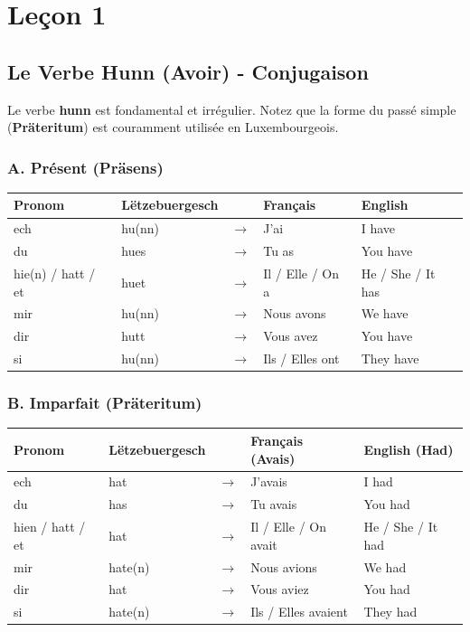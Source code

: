 \chapter{Leçon 1}

	\section{Le Verbe \textbf{Hunn} (Avoir) - Conjugaison}
	Le verbe \textbf{hunn} est fondamental et irrégulier. Notez que la forme du passé simple (\textbf{Präteritum}) est couramment utilisée en Luxembourgeois.
	
	\subsection*{A. Présent (Präsens)}
	\begin{tabular}{ll c l l}
		\toprule
		\textbf{Pronom} & \textbf{Lëtzebuergesch} & \textbf{} & \textbf{Français} & \textbf{English} \\
		\midrule
		ech & hu(nn) & $\rightarrow$ & J'ai & I have \\
		du & hues & $\rightarrow$ & Tu as & You have \\
		hie(n) / hatt / et & huet & $\rightarrow$ & Il / Elle / On a & He / She / It has \\
		\midrule
		mir & hu(nn) & $\rightarrow$ & Nous avons & We have \\
		dir & hutt & $\rightarrow$ & Vous avez & You have \\
		si & hu(nn) & $\rightarrow$ & Ils / Elles ont & They have \\
		\bottomrule
	\end{tabular}
	
	\subsection*{B. Imparfait (Präteritum)}
	\begin{tabular}{ll c l l}
		\toprule
		\textbf{Pronom} & \textbf{Lëtzebuergesch} & \textbf{} & \textbf{Français (Avais)} & \textbf{English (Had)} \\
		\midrule
		ech & hat & $\rightarrow$ & J'avais & I had \\
		du & has & $\rightarrow$ & Tu avais & You had \\
		hien / hatt / et & hat & $\rightarrow$ & Il / Elle / On avait & He / She / It had \\
		\midrule
		mir & hate(n) & $\rightarrow$ & Nous avions & We had \\
		dir & hat & $\rightarrow$ & Vous aviez & You had \\
		si & hate(n) & $\rightarrow$ & Ils / Elles avaient & They had \\
		\bottomrule
	\end{tabular}
	
